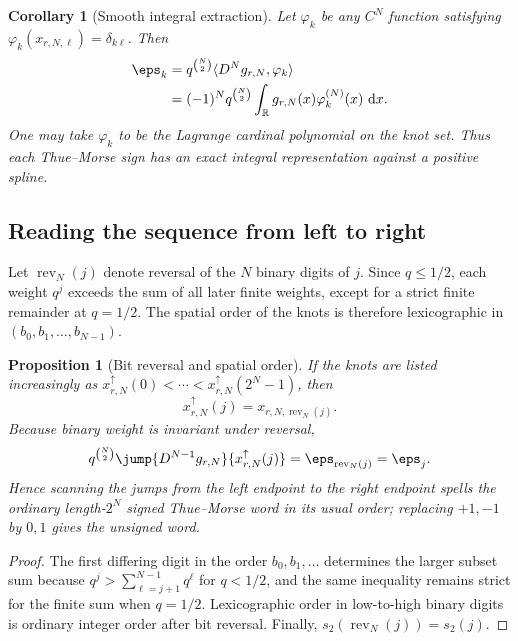 \documentclass[11pt,oneside]{article}
\newtheorem{proposition}[theorem]{Proposition}
\newtheorem{corollary}[theorem]{Corollary}
\theoremstyle{definition}
\newcommand{\dd}{\,\mathrm d}
\newcommand{\R}{\mathbb R}
\begin{document}
\begin{corollary}[Smooth integral extraction]
\label{p2:cor:smooth-TM-extraction}
Let $\varphi_k$ be any $C^N$ function satisfying
$\varphi_k(x_{r,N,\ell})=\delta_{k\ell}$.  Then
\begin{align}
 \eps_k
 &=q^{\binom N2}\langle D^Ng_{r,N},\varphi_k\rangle       \label{p2:eq:eps-test-function}\\
 &=(-1)^Nq^{\binom N2}
   \int_{\R}g_{r,N}(x)\varphi_k^{(N)}(x)\,\dd x.          \label{p2:eq:eps-integral-extraction}
\end{align}
One may take $\varphi_k$ to be the Lagrange cardinal polynomial on the knot
set.  Thus each Thue--Morse sign has an exact integral representation against a
positive spline.
\end{corollary}

\subsection{Reading the sequence from left to right}

Let $\operatorname{rev}_N(j)$ denote reversal of the $N$ binary digits of
$j$.  Since $q\le1/2$, each weight $q^j$ exceeds the sum of all later finite
weights, except for a strict finite remainder at $q=1/2$.  The spatial order of
the knots is therefore lexicographic in $(b_0,b_1,\ldots,b_{N-1})$.

\begin{proposition}[Bit reversal and spatial order]
\label{p2:prop:bit-reversal-order}
If the knots are listed increasingly as
$x_{r,N}^{\uparrow}(0)<\cdots<x_{r,N}^{\uparrow}(2^N-1)$, then
\begin{equation}
 x_{r,N}^{\uparrow}(j)=x_{r,N,\operatorname{rev}_N(j)}.    \label{p2:eq:knot-bit-reversal}
\end{equation}
Because binary weight is invariant under reversal,
\begin{equation}
 q^{\binom N2}
 \jump{D^{N-1}g_{r,N}}{x_{r,N}^{\uparrow}(j)}
 =\eps_{\operatorname{rev}_N(j)}=\eps_j.                  \label{p2:eq:spatial-TM}
\end{equation}
Hence scanning the jumps from the left endpoint to the right endpoint spells
the ordinary length-$2^N$ signed Thue--Morse word in its usual order; replacing
$+1,-1$ by $0,1$ gives the unsigned word.
\end{proposition}

\begin{proof}
The first differing digit in the order $b_0,b_1,\ldots$ determines the larger
subset sum because
$q^j>\sum_{\ell=j+1}^{N-1}q^\ell$ for $q<1/2$, and the same inequality remains
strict for the finite sum when $q=1/2$.  Lexicographic order in low-to-high
binary digits is ordinary integer order after bit reversal.  Finally,
$s_2(\operatorname{rev}_N(j))=s_2(j)$.
\end{proof}
\end{document}
